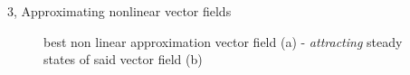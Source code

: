 \documentclass[10pt,a4paper]{article}
\begin{document}
\begin{task}{3, Approximating nonlinear vector fields}
\begin{figure}[ht!]
 \caption{best non linear approximation vector field (a) - \textit{attracting} steady states of said vector field (b)}%
 \label{fig:task3-steadystates}%
\end{figure}
\end{task}
\end{document}
